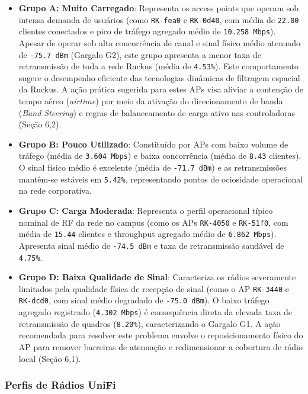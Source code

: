 \begin{itemize}
  \item \textbf{Grupo A: Muito Carregado}: Representa os access points que operam sob intensa demanda de usuários (como \texttt{RK-fea0} e \texttt{RK-0d40}, com média de \texttt{22.00} clientes conectados e pico de tráfego agregado médio de \texttt{10.258 Mbps}). Apesar de operar sob alta concorrência de canal e sinal físico médio atenuado de \texttt{-75.7 dBm} (Gargalo G2), este grupo apresenta a menor taxa de retransmissão de toda a rede Ruckus (média de \texttt{4.53\%}). Este comportamento sugere o desempenho eficiente das tecnologias dinâmicas de filtragem espacial da Ruckus. A ação prática sugerida para estes APs visa aliviar a contenção de tempo aéreo (\textit{airtime}) por meio da ativação do direcionamento de banda (\textit{Band Steering}) e regras de balanceamento de carga ativo nas controladoras (Seção 6,2).
  \item \textbf{Grupo B: Pouco Utilizado}: Constituído por APs com baixo volume de tráfego (média de \texttt{3.604 Mbps}) e baixa concorrência (média de \texttt{8.43} clientes). O sinal físico médio é excelente (média de \texttt{-71.7 dBm}) e as retransmissões mantêm-se estáveis em \texttt{5.42\%}, representando pontos de ociosidade operacional na rede corporativa.
  \item \textbf{Grupo C: Carga Moderada}: Representa o perfil operacional típico nominal de RF da rede no campus (como os APs \texttt{RK-4050} e \texttt{RK-51f0}, com média de \texttt{15.44} clientes e throughput agregado médio de \texttt{6.862 Mbps}). Apresenta sinal médio de \texttt{-74.5 dBm} e taxa de retransmissão saudável de \texttt{4.75\%}.
  \item \textbf{Grupo D: Baixa Qualidade de Sinal}: Caracteriza os rádios severamente limitados pela qualidade física de recepção de sinal (como o AP \texttt{RK-3440} e \texttt{RK-dcd0}, com sinal médio degradado de \texttt{-75.0 dBm}). O baixo tráfego agregado registrado (\texttt{4.302 Mbps}) é consequência direta da elevada taxa de retransmissão de quadros (\texttt{8.20\%}), caracterizando o Gargalo G1. A ação recomendada para resolver este problema envolve o reposicionamento físico do AP para remover barreiras de atenuação e redimensionar a cobertura de rádio local (Seção 6,1).

\end{itemize}
\subsubsection{Perfis de Rádios UniFi}

